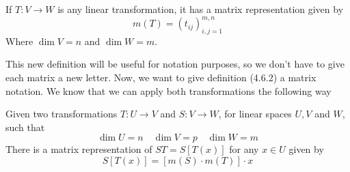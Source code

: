 \documentclass[../linear-spaces.tex]{subfiles}
\begin{document}
\begin{definition}
    If $T: V \to W$ is any linear transformation, it has a matrix representation given by
    \begin{equation}
        m(T) = \left(t_{ij}\right)^{m,n}_{i,j=1}
    \end{equation}
    Where $\dim V = n$ and $\dim W = m$.
\end{definition}
This new definition will be useful for notation purposes, so we don't have to give each matrix a new letter.
Now, we want to give definition (4.6.2) a matrix notation. We know that we can apply both transformations the following way
\begin{theorem}
    Given two transformations $T: U \to V$ and $S: V \to W$, for linear spaces $U,V$ and $W$, such that
    \begin{equation*}
        \dim U = n\quad\dim V = p\quad\dim W = m
    \end{equation*}
    There is a matrix representation of $ST = S\left[T(x)\right]$ for any $x\in U$ given by
    \begin{equation*}
        S\left[T(x)\right] = \left[m(S)\cdot m(T)\right]\cdot x
    \end{equation*}
\end{theorem}
\end{document}

